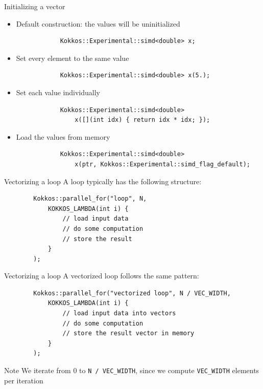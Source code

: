 \documentclass[
    aspectratio=169,
]{beamer}
\begin{document}
\begin{frame}[fragile]{Initializing a vector}
    \begin{itemize}
        \item Default construction: the values will be uninitialized
        \vspace{-5pt}
        \begin{verbatim}
            Kokkos::Experimental::simd<double> x;
        \end{verbatim}
        \item Set every element to the same value
        \vspace{-5pt}
        \begin{verbatim}
            Kokkos::Experimental::simd<double> x(5.);
        \end{verbatim}
        \item Set each value individually
        \vspace{-5pt}
        \begin{verbatim}
            Kokkos::Experimental::simd<double>
                x([](int idx) { return idx * idx; });
        \end{verbatim}
        \item Load the values from memory
        \vspace{-5pt}
        \begin{verbatim}
            Kokkos::Experimental::simd<double>
                x(ptr, Kokkos::Experimental::simd_flag_default);
        \end{verbatim}
    \end{itemize}
\end{frame}

\begin{frame}[fragile]{Vectorizing a loop}
    A loop typically has the following structure:
    \begin{verbatim}
        Kokkos::parallel_for("loop", N,
            KOKKOS_LAMBDA(int i) {
                // load input data
                // do some computation
                // store the result
            }
        );
    \end{verbatim}

\end{frame}

\begin{frame}[fragile]{Vectorizing a loop}
    A vectorized loop follows the same pattern:
    \begin{verbatim}
        Kokkos::parallel_for("vectorized loop", N / VEC_WIDTH,
            KOKKOS_LAMBDA(int i) {
                // load input data into vectors
                // do some computation
                // store the result vector in memory
            }
        );
    \end{verbatim}
    \begin{block}{Note}
        We iterate from 0 to \texttt{N / VEC\_WIDTH}, since we compute \texttt{VEC\_WIDTH} elements per iteration
    \end{block}
\end{frame}
\end{document}
